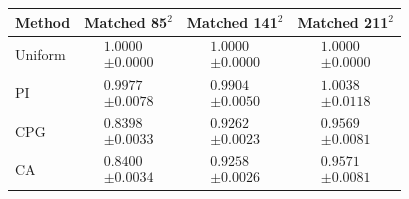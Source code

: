 \begin{tabular}{lccc}
\toprule
Method & Matched 85$^2$ & Matched 141$^2$ & Matched 211$^2$ \\
\midrule
Uniform & $\begin{gathered}1.0000\\[-2pt]\pm 0.0000\end{gathered}$ & $\begin{gathered}1.0000\\[-2pt]\pm 0.0000\end{gathered}$ & $\begin{gathered}1.0000\\[-2pt]\pm 0.0000\end{gathered}$ \\
PI & $\begin{gathered}0.9977\\[-2pt]\pm 0.0078\end{gathered}$ & $\begin{gathered}0.9904\\[-2pt]\pm 0.0050\end{gathered}$ & $\begin{gathered}1.0038\\[-2pt]\pm 0.0118\end{gathered}$ \\
CPG & $\begin{gathered}0.8398\\[-2pt]\pm 0.0033\end{gathered}$ & $\begin{gathered}0.9262\\[-2pt]\pm 0.0023\end{gathered}$ & $\begin{gathered}0.9569\\[-2pt]\pm 0.0081\end{gathered}$ \\
CA & $\begin{gathered}0.8400\\[-2pt]\pm 0.0034\end{gathered}$ & $\begin{gathered}0.9258\\[-2pt]\pm 0.0026\end{gathered}$ & $\begin{gathered}0.9571\\[-2pt]\pm 0.0081\end{gathered}$ \\
\bottomrule
\end{tabular}
